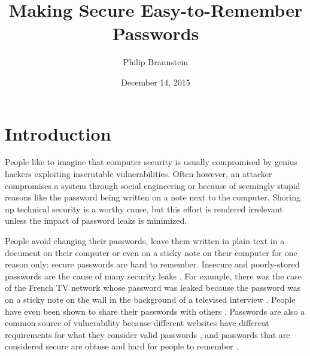 \documentclass{article}
\title{Making Secure Easy-to-Remember Passwords}
\author{Philip Braunstein}
\date{December 14, 2015}
\begin{document}
\maketitle
{}

\section*{Introduction}
People like to imagine that computer security is usually compromised by genius hackers exploiting inscrutable vulnerabilities. Often however, an attacker compromises a system through social engineering \cite{social} or because of seemingly stupid reasons like the password being written on a note next to the computer. Shoring up technical security is a worthy cause, but this effort is rendered irrelevant unless the impact of password leaks is minimized.

People avoid changing their passwords, leave them written in plain text in a document on their computer or even on a sticky note on their computer for one reason only: secure passwords are hard to remember. Insecure and poorly-stored passwords are the cause of many security leaks \cite{stupid}. For example, there was the case of the French TV network whose password was leaked because the password was on a sticky note on the wall in the background of a televised interview \cite{tv}. People have even been shown to share their passwords with others \cite{share}. Passwords are also a common source of vulnerability because different websites have different requirements for what they consider valid passwords \cite{diff}, and passwords that are considered secure are obtuse and hard for people to remember \cite{remem}.
\end{document}
